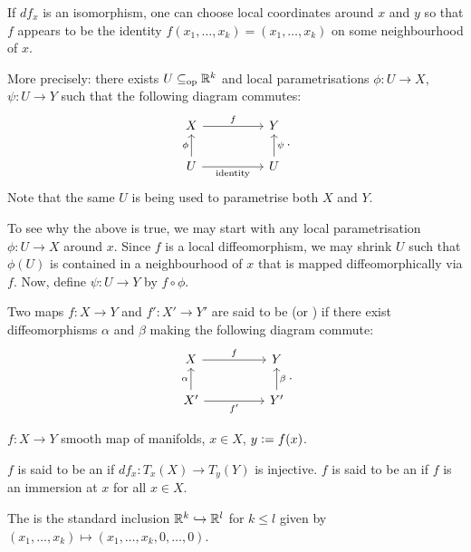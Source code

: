 \begin{rem}
	If $df_{x}$ is an isomorphism, one can choose local coordinates around $x$ and $y$ so that $f$ appears to be the identity $f(x_{1}, \ldots, x_{k}) = (x_{1}, \ldots, x_{k})$ on some neighbourhood of $x$.

	More precisely: there exists $U \subseteq_{\operatorname{op}} \mathbb{R}^{k}$ and local parametrisations $\phi : U \to X$, $\psi : U \to Y$ such that the following diagram commutes:
	\begin{equation*} 
		\begin{tikzcd}
			X \arrow[rr, "f"] & & Y \\
			U \arrow[u, "\phi"] \arrow[rr, "\text{identity}"'] & & U \arrow[u, "\psi"']
		\end{tikzcd}.
	\end{equation*}
	Note that the same $U$ is being used to parametrise both $X$ and $Y$.

	To see why the above is true, we may start with any local parametrisation $\phi : U \to X$ around $x$. Since $f$ is a local diffeomorphism, we may shrink $U$ such that $\phi(U)$ is contained in a neighbourhood of $x$ that is mapped diffeomorphically via $f$. Now, define $\psi : U \to Y$ by $f \circ \phi$.
\end{rem}

\begin{defn}
	Two maps $f : X \to Y$ and $f' : X' \to Y'$ are said to be  (or ) if there exist diffeomorphisms $\alpha$ and $\beta$ making the following diagram commute:
	\begin{equation*}  
		\begin{tikzcd}
			X \arrow[rr, "f"] & & Y \\
			X' \arrow[u, "\alpha"] \arrow[rr, "f'"'] & & Y' \arrow[u, "\beta"']
		\end{tikzcd}.		
	\end{equation*}
\end{defn}

\begin{defn} \label{defn:immersions}
	$f : X \to Y$ smooth map of manifolds, $x \in X$, $y \vcentcolon= f(x)$.

	$f$ is said to be an  if $df_{x} : T_{x}(X) \to T_{y}(Y)$ is injective. \newline
	$f$ is said to be an  if $f$ is an immersion at $x$ for all $x \in X$. 

	The  is the standard inclusion $\mathbb{R}^{k} \hookrightarrow \mathbb{R}^{l}$ for $k \le l$ given by $(x_{1}, \ldots, x_{k}) \mapsto (x_{1}, \ldots, x_{k}, 0, \ldots, 0)$.
\end{defn}

